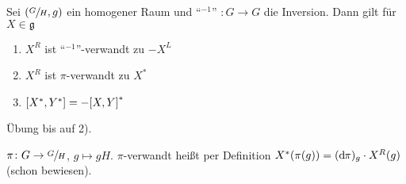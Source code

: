 \begin{lemma}
	Sei $\enbrace*{\sfrac{G}{H},g}$ ein homogener Raum und \enquote{${}^{-1}$} $\colon G\to G$ die Inversion.
	Dann gilt für $X \in \mathfrak{g}$ 
	\begin{enumerate}[1)]
		\item $X^R$ ist \enquote{${}^{-1}$}-verwandt zu $-X^L$
		\item $X^R$ ist $\pi$-verwandt zu $X^*$
		\item $\benbrace*{X^*,Y^*} = - \benbrace*{X,Y}^*$
	\end{enumerate}
\end{lemma}
\begin{beweis}
	Übung bis auf 2).
	
	$\pi \colon G \to \sfrac{G}{H}$, $g \mapsto gH$. $\pi$-verwandt heißt per Definition $X^*(\pi(g)) = (\mathd \pi)_g \cdot X^R(g)$ (schon bewiesen).
\end{beweis}

